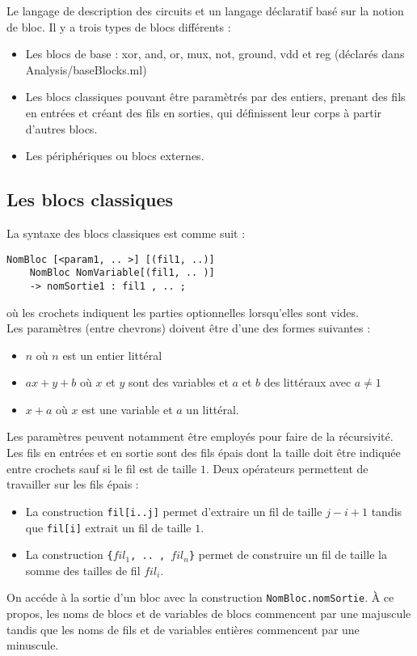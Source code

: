\documentclass{article}
\begin{document}
Le langage de description des circuits et un langage déclaratif basé sur la notion de bloc. Il y a trois types de blocs différents :
\begin{itemize}
\item Les blocs de base : xor, and, or, mux, not, ground, vdd et reg (déclarés dans Analysis/baseBlocks.ml)
\item Les blocs classiques pouvant être paramètrés par des entiers, prenant des fils en entrées et créant des fils en sorties, qui définissent leur corps à partir d'autres blocs.
\item Les périphériques ou blocs externes.
\end{itemize}

\subsection{Les blocs classiques}
La syntaxe des blocs classiques est comme suit :
\begin{verbatim}
NomBloc [<param1, .. >] [(fil1, ..)]
    NomBloc NomVariable[(fil1, .. )]
    -> nomSortie1 : fil1 , .. ;
\end{verbatim}

où les crochets indiquent les parties optionnelles lorsqu'elles sont vides. \\
Les paramètres (entre chevrons) doivent être d'une des formes suivantes :
\begin{itemize}
\item$n$ où $n$ est un entier littéral
\item$ax + y + b$ où $x$ et $y$ sont des variables et $a$ et $b$ des littéraux avec $a \neq 1$
\item$x + a$ où $x$ est une variable et $a$ un littéral. 
\end{itemize}
Les paramètres peuvent notamment être employés pour faire de la récursivité.\\
Les fils en entrées et en sortie sont des fils épais dont la taille doit être indiquée entre crochets sauf si le fil est de taille $1$. Deux opérateurs permettent de travailler sur les fils épais :
\begin{itemize}
\item La construction \texttt{fil[i..j]} permet d'extraire un fil de taille $j - i + 1$ tandis que \texttt{fil[i]} extrait un fil de taille $1$.
\item La construction \texttt{\{$fil_{1}$, .. , $fil_{n}$\}} permet de construire un fil de taille la somme des tailles de fil $fil_{i}$.
\end{itemize}
On accéde à la sortie d'un bloc avec la construction \texttt{NomBloc.nomSortie}. À ce propos, les noms de blocs et de variables de blocs commencent par une majuscule tandis que les noms de fils et de variables entières commencent par une minuscule. 
\end{document}
